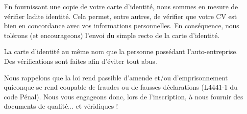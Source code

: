 En fournissant une copie de votre carte d'identité, nous sommes en mesure de vérifier ladite identité.
Cela permet, entre autres, de vérifier que votre CV est bien en concordance avec vos informations personnelles.
En conséquence, nous tolérons (et encourageons) l'envoi du simple recto de la carte d'identité.

La carte d'identité  au même nom que la personne possédant l'auto-entreprise. Des vérifications sont faites afin d'éviter tout abus.

Nous rappelons que la loi rend passible d'amende et/ou d'emprisonnement quiconque se rend coupable de fraudes ou de fausses déclarations (L4441-1 du code Pénal). Nous vous engageons donc, lors de l'inscription, à nous fournir des documents de qualité... et véridiques !